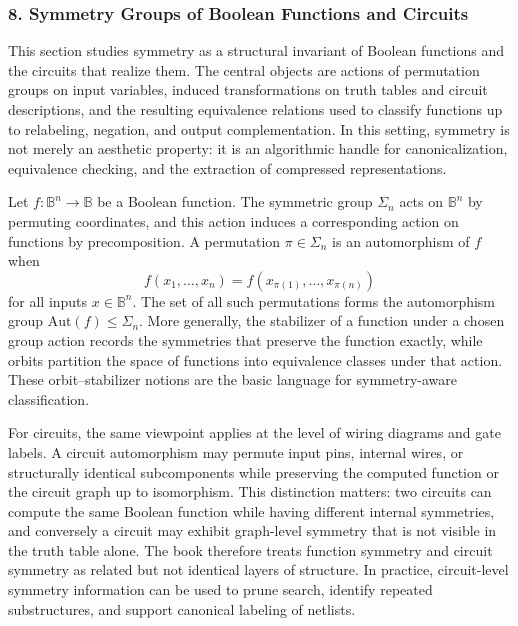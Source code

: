 \documentclass[11pt]{article}
\begin{document}
\subsubsection{8. Symmetry Groups of Boolean Functions and Circuits}


This section studies symmetry as a structural invariant of Boolean functions and the circuits that realize them. The central objects are actions of permutation groups on input variables, induced transformations on truth tables and circuit descriptions, and the resulting equivalence relations used to classify functions up to relabeling, negation, and output complementation. In this setting, symmetry is not merely an aesthetic property: it is an algorithmic handle for canonicalization, equivalence checking, and the extraction of compressed representations.

Let $f : \mathbb{B}^n \to \mathbb{B}$ be a Boolean function. The symmetric group $\Sigma_n$ acts on $\mathbb{B}^n$ by permuting coordinates, and this action induces a corresponding action on functions by precomposition. A permutation $\pi \in \Sigma_n$ is an automorphism of $f$ when
\[
  f(x_1,\dots,x_n) = f(x_{\pi(1)},\dots,x_{\pi(n)})
\]
for all inputs $x \in \mathbb{B}^n$. The set of all such permutations forms the automorphism group $\mathrm{Aut}(f) \leq \Sigma_n$. More generally, the stabilizer of a function under a chosen group action records the symmetries that preserve the function exactly, while orbits partition the space of functions into equivalence classes under that action. These orbit--stabilizer notions are the basic language for symmetry-aware classification.

For circuits, the same viewpoint applies at the level of wiring diagrams and gate labels. A circuit automorphism may permute input pins, internal wires, or structurally identical subcomponents while preserving the computed function or the circuit graph up to isomorphism. This distinction matters: two circuits can compute the same Boolean function while having different internal symmetries, and conversely a circuit may exhibit graph-level symmetry that is not visible in the truth table alone. The book therefore treats function symmetry and circuit symmetry as related but not identical layers of structure. In practice, circuit-level symmetry information can be used to prune search, identify repeated substructures, and support canonical labeling of netlists.
\end{document}
